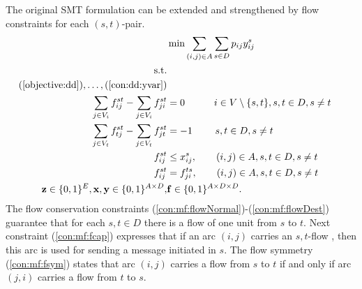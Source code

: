 The original SMT formulation can be extended and strengthened by flow constraints for each $(s,t)$-pair.
\newline
\newline    
\begin{subequations}
\begin{flalign}
\label{objective:dd} \makebox[0pt][l]{$\displaystyle{} \min \sum\limits_{(i,j) \in A} \sum\limits_{s \in D} p_{ij} y^s_{ij} $}  \\ 
\text{s.t.}    \notag   \\	
(\ref{objective:dd}),\dots,(\ref{con:dd:yvar}) \notag \\ 
 \label{con:mf:flowNormal}  \sum\limits_{\substack{ j\in V_i}}f^{st}_{ij}-\sum\limits_{\substack{j\in V_i }}f^{st}_{ji}    & = 0   \quad \quad\quad 			  i\in V\setminus\{s,t\}, s,t\in D, s \neq t &\\	
\label{con:mf:flowDest}  \sum\limits_{\substack{ j\in V_t }}f^{st}_{tj}-\sum\limits_{\substack{j\in V_t}}f^{st}_{jt}    & = -1  \quad\quad ~ s,t\in D, s \neq t &\\	
 \label{con:mf:fcap}   f^{st}_{ij} &\leq  x^{s}_{ij},\quad\quad    (i,j)\in A,  s,t\in D, s \neq t  & \\ 		 			 	 
 \label{con:mf:fsym}   f^{st}_{ij} &=  f^{ts}_{ji},  \quad\quad(i,j)\in A,  s,t\in D, s \neq t  &\\   	
\label{con:mf:xydim}	\mathbf{z} \in \{0,1\}^{E}, \mathbf{x},\mathbf{y}\in \{0,1\}^{A\times D}, & \mathbf{f}\in\{0,1\}^{A\times D\times D}. 
\end{flalign}~
\end{subequations}  
The flow conservation constraints (\ref{con:mf:flowNormal})-(\ref{con:mf:flowDest}) guarantee that for each $s,t\in D$ there is a flow of one unit from $s$ to $t$. Next constraint (\ref{con:mf:fcap}) expresses that if an arc $(i,j)$ carries an $s,t$-flow , then this arc is used for sending a message initiated in $s$. The flow symmetry (\ref{con:mf:fsym}) states that arc $(i,j)$ carries a flow from $s$ to $t$ if and only if arc $(j,i)$ carries a flow from $t$ to $s$.

